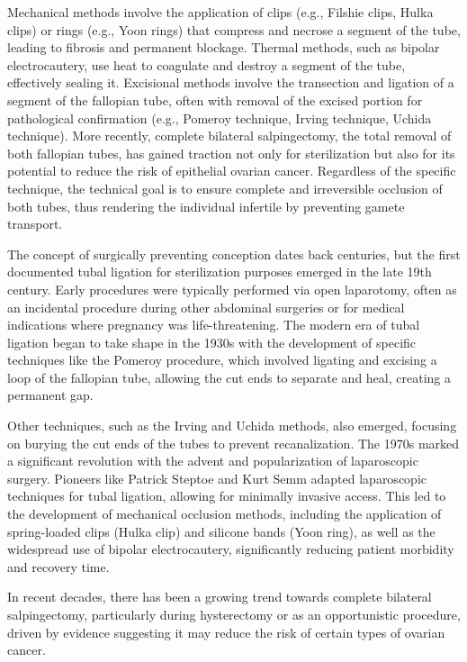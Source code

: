 Mechanical methods involve the application of clips (e.g., Filshie clips, Hulka clips) or rings (e.g., Yoon rings) that compress and necrose a segment of the tube, leading to fibrosis and permanent blockage. Thermal methods, such as bipolar electrocautery, use heat to coagulate and destroy a segment of the tube, effectively sealing it. Excisional methods involve the transection and ligation of a segment of the fallopian tube, often with removal of the excised portion for pathological confirmation (e.g., Pomeroy technique, Irving technique, Uchida technique). More recently, complete bilateral salpingectomy, the total removal of both fallopian tubes, has gained traction not only for sterilization but also for its potential to reduce the risk of epithelial ovarian cancer. Regardless of the specific technique, the technical goal is to ensure complete and irreversible occlusion of both tubes, thus rendering the individual infertile by preventing gamete transport.

The concept of surgically preventing conception dates back centuries, but the first documented tubal ligation for sterilization purposes emerged in the late 19th century. Early procedures were typically performed via open laparotomy, often as an incidental procedure during other abdominal surgeries or for medical indications where pregnancy was life-threatening. The modern era of tubal ligation began to take shape in the 1930s with the development of specific techniques like the Pomeroy procedure, which involved ligating and excising a loop of the fallopian tube, allowing the cut ends to separate and heal, creating a permanent gap. 

Other techniques, such as the Irving and Uchida methods, also emerged, focusing on burying the cut ends of the tubes to prevent recanalization. The 1970s marked a significant revolution with the advent and popularization of laparoscopic surgery. Pioneers like Patrick Steptoe and Kurt Semm adapted laparoscopic techniques for tubal ligation, allowing for minimally invasive access. This led to the development of mechanical occlusion methods, including the application of spring-loaded clips (Hulka clip) and silicone bands (Yoon ring), as well as the widespread use of bipolar electrocautery, significantly reducing patient morbidity and recovery time. 

In recent decades, there has been a growing trend towards complete bilateral salpingectomy, particularly during hysterectomy or as an opportunistic procedure, driven by evidence suggesting it may reduce the risk of certain types of ovarian cancer.

